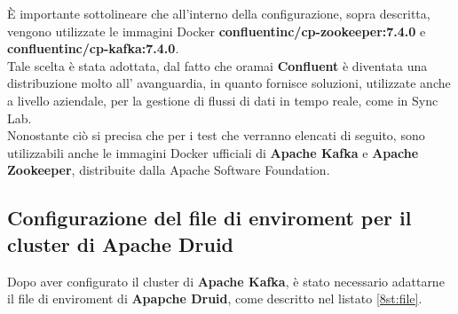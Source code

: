 È importante sottolineare che all'interno della configurazione, sopra descritta, 
vengono utilizzate le \gls{immagini Docker}{} \textbf{confluentinc/cp-zookeeper:7.4.0} e \\\textbf{confluentinc/cp-kafka:7.4.0}.\\
Tale scelta è stata adottata, dal fatto che oramai \textbf{Confluent} 
è diventata una distribuzione molto all' avanguardia, in quanto fornisce soluzioni, utilizzate anche a livello aziendale,
per la gestione di flussi di dati in tempo reale, come in Sync Lab.\\
Nonostante ciò si precisa che per i test che verranno elencati di seguito,
sono utilizzabili anche le \gls{immagini Docker}{} ufficiali di \textbf{Apache Kafka} e \textbf{Apache Zookeeper}, distribuite dalla 
\gls{Apache Software Foundation}.
\subsection{Configurazione del file di enviroment per il cluster di Apache Druid}
Dopo aver configurato il \gls{cluster}{} di \textbf{Apache Kafka}, è stato necessario adattarne il file di \gls{enviroment}{} di \textbf{Apapche Druid}, come descritto nel listato \ref{8st:file}.
